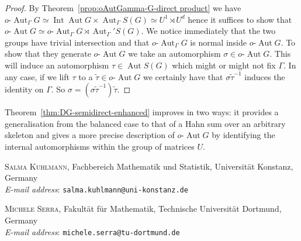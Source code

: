 \documentclass[12pt,a4paper,reqno,openright]{amsart}
\renewcommand{\1}{\mathbbm{1}}
\DeclareMathOperator{\Aut}{Aut}
\DeclareMathOperator{\Int}{Int}
\newcommand{\oAut}{o\text{-}\Aut}
\theoremstyle{definition}
\theoremstyle{plain}
\theoremstyle{plain}
\theoremstyle{plain}
\theoremstyle{plain}
\theoremstyle{plain}
\theoremstyle{plain}
\theoremstyle{plain}
\theoremstyle{plain}
\theoremstyle{definition}
\theoremstyle{definition}
\theoremstyle{plain}
\theoremstyle{definition}
\theoremstyle{definition}
\theoremstyle{plain}
\theoremstyle{plain}
\theoremstyle{plain}
\begin{document}
\begin{proof}
	By Theorem~\ref{prop:oAutGamma-G-direct product} we have
	$ \oAut_\Gamma G \simeq \Int\Aut G \times \Aut_\Gamma S(G) \simeq U^1 \rtimes U^d $ hence it suffices to show that $ \oAut G \simeq \oAut_\Gamma G \rtimes \Aut_\Gamma'S(G) $. We notice immediately that the two groups have trivial intersection and that $ \oAut_\Gamma G $ is normal inside $ \oAut G $. To show that they generate $ \oAut G $ we take an automorphism $ \sigma\in\oAut G $. This will induce an automorphism $ \tau\in\Aut S(G) $ which might or might not fix $ \Gamma $. In any case, if we lift $ \tau $ to a $ \tilde{\tau}\in\oAut G $ we certainly have that $ \sigma\tilde\tau^{-1} $ induces the identity on $ \Gamma $. So $ \sigma = (\sigma\tilde\tau^{-1})\tilde\tau $.
\end{proof}

Theorem~\ref{thm:DG-semidirect-enhanced} improves \cite[Corollary~3.2]{droste-goebel} in two ways: it provides a generalisation from the balanced case to that of a Hahn sum over an arbitrary skeleton and gives a more precise description of $ \oAut G $ by identifying the internal automorphisms within the group of matrices $ U $.

\printbibliography


\bigskip


\textsc{Salma Kuhlmann}, Fachbereich Mathematik und Statistik, Universität Konstanz, Germany\\
\textit{E-mail address}: \texttt{salma.kuhlmann@uni-konstanz.de}

\medskip

\textsc{Michele Serra}, Fakultät für Mathematik, Technische Universität Dortmund, Germany\\
\textit{E-mail address}: \texttt{michele.serra@tu-dortmund.de}
\end{document}
